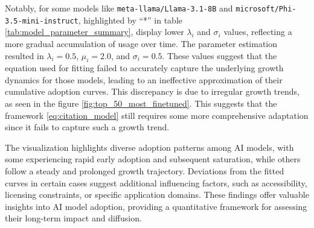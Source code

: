 \documentclass{article} %
\begin{document}
Notably, for some models like \texttt{meta-llama/Llama-3.1-8B} and \texttt{microsoft/Phi-3.5-mini-instruct}, highlighted by ``*'' in table \ref{tab:model_parameter_summary}, display lower $\lambda_i$ and $\sigma_i$ values, reflecting a more gradual accumulation of usage over time. The parameter estimation resulted in $\lambda_i = 0.5$, $\mu_i = 2.0$, and $\sigma_i = 0.5$. These values suggest that the equation used for fitting failed to accurately capture the underlying growth dynamics for those models, leading to an ineffective approximation of their cumulative adoption curves. This discrepancy is due to irregular growth trends, as seen in the figure \ref{fig:top_50_most_finetuned}. This suggests that the framework \ref{eq:citation_model} still requires some more comprehensive adaptation since it fails to capture such a growth trend. 

The visualization highlights diverse adoption patterns among AI models, with some experiencing rapid early adoption and subsequent saturation, while others follow a steady and prolonged growth trajectory. Deviations from the fitted curves in certain cases suggest additional influencing factors, such as accessibility, licensing constraints, or specific application domains. These findings offer valuable insights into AI model adoption, providing a quantitative framework for assessing their long-term impact and diffusion.
\end{document}
